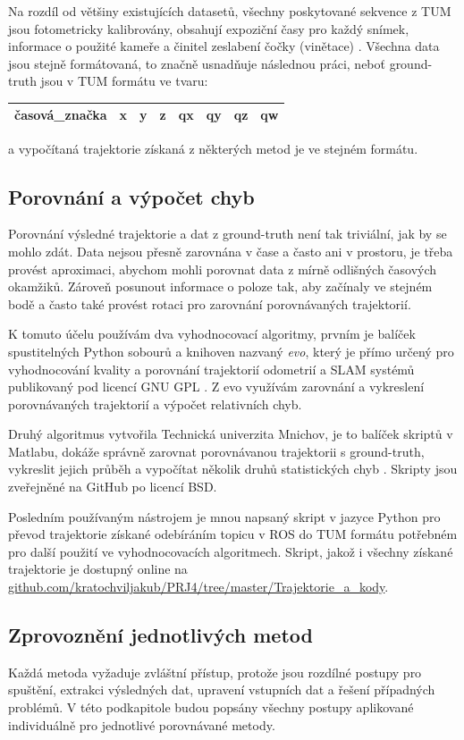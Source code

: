 \documentclass[12pt,a4paper]{article}
\begin{document}
Na rozdíl od většiny existujících datasetů, všechny poskytované sekvence z TUM jsou fotometricky kalibrovány, obsahují expoziční časy pro každý snímek, informace o použité kameře a činitel zeslabení čočky (vinětace) \cite{TUM_datasets}. Všechna data jsou stejně formátovaná, to značně usnadňuje následnou práci, neboť ground-truth jsou v TUM formátu ve tvaru:

\begin{center}
\begin{tabular}{|l|l|l|l|l|l|l|l|}
\hline
časová\_značka & x & y & z & qx & qy & qz & qw \\
\hline
\end{tabular}
\end{center}
a vypočítaná trajektorie získaná z některých metod je ve stejném formátu.

\subsection{Porovnání a výpočet chyb}
Porovnání výsledné trajektorie a dat z ground-truth není tak triviální, jak by se mohlo zdát. Data nejsou přesně zarovnána v čase a často ani v prostoru, je třeba provést aproximaci, abychom mohli porovnat data z mírně odlišných časových okamžiků. Zároveň posunout informace o poloze tak, aby začínaly ve stejném bodě a často také provést rotaci pro zarovnání porovnávaných trajektorií.

K tomuto účelu používám dva vyhodnocovací algoritmy, prvním je balíček spustitelných Python sobourů a knihoven nazvaný \textit{evo}, který je přímo určený pro vyhodnocování kvality a porovnání trajektorií odometrií a SLAM systémů publikovaný pod licencí GNU GPL \cite{evo}. Z evo využívám zarovnání a vykreslení porovnávaných trajektorií a výpočet relativních chyb.

Druhý algoritmus vytvořila Technická univerzita Mnichov, je to balíček skriptů v Matlabu, dokáže správně zarovnat porovnávanou trajektorii s ground-truth, vykreslit jejich průběh a vypočítat několik druhů statistických chyb \cite{tum_evo}. Skripty jsou zveřejněné na GitHub po licencí BSD.

Posledním používaným nástrojem je mnou napsaný skript v jazyce Python pro převod trajektorie získané odebíráním topicu v ROS do TUM formátu potřebném pro další použití ve vyhodnocovacích algoritmech. Skript, jakož i všechny získané trajektorie je dostupný online na \url{github.com/kratochviljakub/PRJ4/tree/master/Trajektorie_a_kody}.

\subsection{Zprovoznění jednotlivých metod}
Každá metoda vyžaduje zvláštní přístup, protože jsou rozdílné postupy pro spuštění, extrakci výsledných dat, upravení vstupních dat a řešení případných problémů. V této podkapitole budou popsány všechny postupy aplikované individuálně pro jednotlivé porovnávané metody.
\end{document}
